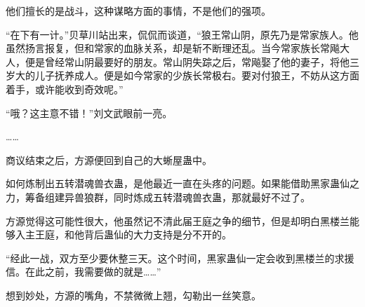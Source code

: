 \begin{this_body}
他们擅长的是战斗，这种谋略方面的事情，不是他们的强项。

“在下有一计。”贝草川站出来，侃侃而谈道，“狼王常山阴，原先乃是常家族人。他虽然扬言报复，但和常家的血脉关系，却是斩不断理还乱。当今常家族长常飚大人，便是曾经常山阴最要好的朋友。常山阴失踪之后，常飚娶了他的妻子，将他三岁大的儿子抚养成人。便是如今常家的少族长常极右。要对付狼王，不妨从这方面着手，或许能收到奇效呢。”

“哦？这主意不错！”刘文武眼前一亮。

……

商议结束之后，方源便回到自己的大蜥屋蛊中。

如何炼制出五转潜魂兽衣蛊，是他最近一直在头疼的问题。如果能借助黑家蛊仙之力，筹备组建异兽狼群，同时炼成五转潜魂兽衣蛊，那就最好不过了。

方源觉得这可能性很大，他虽然记不清此届王庭之争的细节，但是却明白黑楼兰能够入主王庭，和他背后蛊仙的大力支持是分不开的。

“经此一战，双方至少要休整三天。这个时间，黑家蛊仙一定会收到黑楼兰的求援信。在此之前，我需要做的就是……”

想到妙处，方源的嘴角，不禁微微上翘，勾勒出一丝笑意。

\end{this_body}

